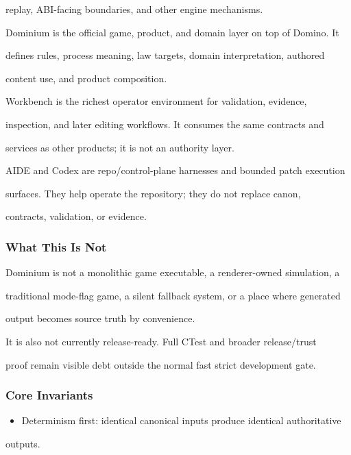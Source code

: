 \documentclass[9pt,a4paper,openany]{book}
\begin{document}
replay, ABI-\allowbreak{}facing boundaries, and other engine mechanisms.\allowbreak{}


Dominium is the official game, product, and domain layer on top of Domino.\allowbreak{} It

defines rules, process meaning, law targets, domain interpretation, authored

content use, and product composition.\allowbreak{}


Workbench is the richest operator environment for validation, evidence,

inspection, and later editing workflows.\allowbreak{} It consumes the same contracts and

services as other products; it is not an authority layer.\allowbreak{}


AIDE and Codex are repo/\allowbreak{}control-\allowbreak{}plane harnesses and bounded patch execution

surfaces.\allowbreak{} They help operate the repository; they do not replace canon,

contracts, validation, or evidence.\allowbreak{}


\subsubsection{What This Is Not}

Dominium is not a monolithic game executable, a renderer-\allowbreak{}owned simulation, a

traditional mode-\allowbreak{}flag game, a silent fallback system, or a place where generated

output becomes source truth by convenience.\allowbreak{}


It is also not currently release-\allowbreak{}ready.\allowbreak{} Full CTest and broader release/\allowbreak{}trust

proof remain visible debt outside the normal fast strict development gate.\allowbreak{}


\subsubsection{Core Invariants}

\begin{itemize}
\item Determinism first: identical canonical inputs produce identical authoritative
\end{itemize}
outputs.\allowbreak{}
\end{document}
